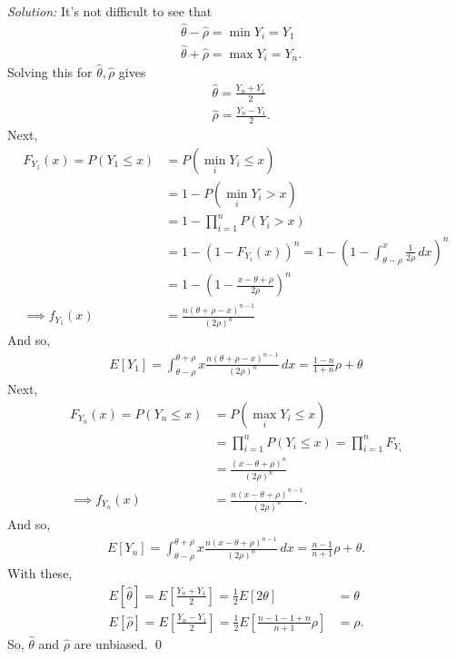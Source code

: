 \documentclass{book}
\theoremstyle{definition}
\newcommand{\nn}{\nonumber}
\newcommand{\f}[2]{\frac{#1}{#2}}
\newcommand{\lp}{\left(}
\newcommand{\rp}{\right)}
\newcommand{\lb}{\left[}
\newcommand{\rb}{\right]}
\begin{document}
\noindent \textit{Solution:} It's not difficult to see that
\begin{align}
&\hat\theta - \hat\rho = \min Y_i = Y_1\nn\\
&\hat\theta + \hat\rho = \max Y_i = Y_n.
\end{align}
Solving this for $\hat\theta, \hat\rho$ gives
\begin{align}
&\hat\theta = \f{Y_n + Y_1}{2}\nn\\
&\hat\rho = \f{Y_n - Y_1}{2}.
\end{align}
Next, 
\begin{align}
F_{Y_1}(x) = P(Y_1 \leq x) &= P(\min_i Y_i \leq x)\nn\\
&= 1 - P(\min_i Y_i > x)\nn\\
&= 1 - \prod^n_{i=1}P(Y_i > x)\nn\\
&= 1 - (1 - F_{Y_i}(x))^n = 1 - \lp 1- \int^x_{\theta-\rho}\f{1}{2\rho}\,dx \rp^n\nn\\
&= 1 - \lp 1- \f{x-\theta+\rho}{2\rho} \rp^n\nn\\
\implies  f_{Y_1}(x) &= \f{n(\theta + \rho - x)^{n-1}}{(2\rho)^n}
\end{align}
And so, 
\begin{align}
E[Y_1] = \int_{\theta-\rho}^{\theta+\rho} x\f{n(\theta + \rho - x)^{n-1}}{(2\rho)^n}\,dx = \f{1 - n }{1 + n} \rho + \theta
\end{align}
Next, 
\begin{align}
F_{Y_n}(x) = P(Y_n \leq x) &= P(\max_i Y_i \leq x)\nn\\
&= \prod^n_{i=1}P(Y_i \leq x) = \prod^n_{i=1}F_{Y_i}\nn\\
&= \f{(x-\theta+\rho)^{n}}{(2\rho)^n}\nn\\
\implies f_{Y_n}(x) &= \f{n(x-\theta+\rho)^{n-1}}{(2\rho)^n}.
\end{align}
And so,
\begin{align}
E[Y_n] = \int^{\theta+\rho}_{\theta-\rho} x \f{n(x-\theta+\rho)^{n-1}}{(2\rho)^n}\,dx = \f{n-1}{n+1}\rho + \theta.
\end{align}
With these,
\begin{align}
E[\hat\theta] = E\lb \f{Y_n + Y_1}{2} \rb = \f{1}{2}E\lb 2\theta\rb &= \theta\nn\\
E[\hat\rho] = E\lb \f{Y_n - Y_1}{2} \rb = \f{1}{2}E\lb \f{n-1-1+n}{n+1}\rho \rb &= \rho.
\end{align}
So, $\hat\theta$ and $\hat\rho$ are unbiased. \qed
\end{document}
